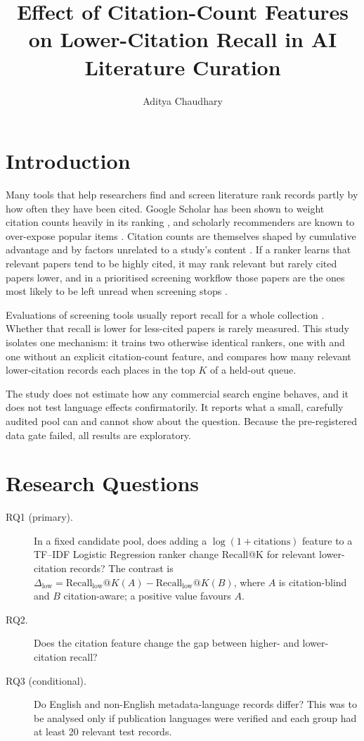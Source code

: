 \documentclass[acmsmall,screen,nonacm]{acmart}
\title{Effect of Citation-Count Features on Lower-Citation Recall in AI Literature Curation}
\author{Aditya Chaudhary}
\affiliation{%
  \institution{Indian Institute of Information Technology, Allahabad}
  \country{India}
}
\begin{document}
\maketitle
\setlength{\emergencystretch}{2em}

\section{Introduction}
\label{sec:intro}

Many tools that help researchers find and screen literature rank records partly by how often they have
been cited. Google Scholar has been shown to weight citation counts heavily in its ranking
\cite{beel2009citation}, and scholarly recommenders are known to over-expose popular items
\cite{farber2023biases,klimashevskaia2024survey}. Citation counts are themselves shaped by cumulative
advantage \cite{merton1968matthew} and by factors unrelated to a study's content
\cite{duyx2017scientific,lund2025predictors}. If a ranker learns that relevant papers tend to be highly
cited, it may rank relevant but rarely cited papers lower, and in a prioritised screening workflow those
papers are the ones most likely to be left unread when screening stops \cite{callaghan2020stopping}.

Evaluations of screening tools usually report recall for a whole collection
\cite{przybyla2018prioritising,vandeschoot2021asreview,aigner2026comparing}. Whether that recall is
lower for less-cited papers is rarely measured. This study isolates one mechanism: it trains two
otherwise identical rankers, one with and one without an explicit citation-count feature, and compares
how many relevant lower-citation records each places in the top $K$ of a held-out queue.

The study does not estimate how any commercial search engine behaves, and it does not test language
effects confirmatorily. It reports what a small, carefully audited pool can and cannot show about the question. Because the pre-registered data gate failed, all results are
exploratory.

\section{Research Questions}
\label{sec:rq}

\begin{description}
\item[RQ1 (primary).] In a fixed candidate pool, does adding a $\log(1+\text{citations})$ feature to a
TF--IDF Logistic Regression ranker change Recall@K for relevant lower-citation records? The contrast is
$\Delta_{\text{low}} = \text{Recall}_{\text{low}}@K(A) - \text{Recall}_{\text{low}}@K(B)$, where $A$ is
citation-blind and $B$ citation-aware; a positive value favours $A$.
\item[RQ2.] Does the citation feature change the gap between higher- and lower-citation recall?
\item[RQ3 (conditional).] Do English and non-English metadata-language records differ? This was to be
analysed only if publication languages were verified and each group had at least 20 relevant test
records.
\end{description}
\end{document}
